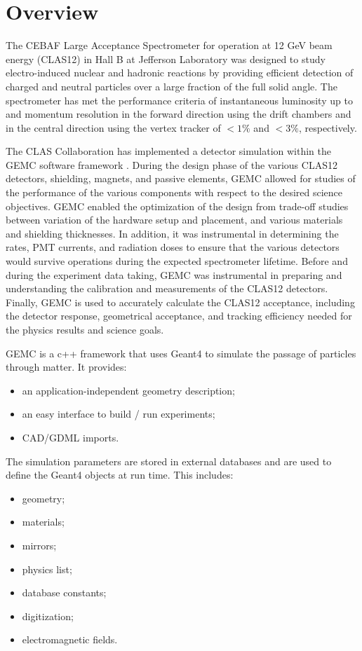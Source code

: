 \section{Overview}

The CEBAF Large Acceptance Spectrometer for operation at 12 GeV beam energy (CLAS12) \cite{clas12-nim} in Hall B at Jefferson Laboratory was designed to study
electro-induced nuclear and hadronic reactions by providing efficient detection of charged and neutral particles over a large
fraction of the full solid angle. The spectrometer has met the performance criteria of instantaneous luminosity up
to \cLuminosity and momentum resolution in the forward direction using the drift chambers and in the central
direction using the vertex tracker of $< 1\%$ and $< 3\%$, respectively.

The CLAS Collaboration has implemented a detector simulation within the GEMC software framework \cite{GEMC}.
During the design phase of the various CLAS12 detectors, shielding, magnets, and passive elements, GEMC allowed for studies of the
performance of the various components with respect to the desired science objectives.
GEMC enabled the optimization of the design from trade-off studies between variation of the hardware setup and placement,
and various materials and shielding thicknesses.
In addition, it was instrumental in determining the rates, PMT currents, and radiation doses to ensure that the various detectors
would survive operations during the expected spectrometer lifetime.
Before and during the experiment data taking, GEMC was instrumental in preparing and understanding the calibration
and measurements of the CLAS12 detectors.
Finally, GEMC is used to accurately calculate the CLAS12 acceptance, including the detector response, geometrical acceptance,
and tracking efficiency needed for the physics results and science goals.


GEMC is a c++ framework that uses Geant4 \cite{geant4} to simulate the passage of particles through matter. It provides:
\begin{itemize}
	\item an application-independent geometry description;
	\item an easy interface to build / run experiments;
	\item CAD/GDML imports.
\end{itemize}

The simulation parameters are stored in external databases and are used to define the Geant4 objects at run time. This includes:
\begin{itemize}
	\item geometry;
	\item materials;
	\item mirrors;
	\item physics list;
	\item database constants;
	\item digitization;
	\item electromagnetic fields.
\end{itemize}

